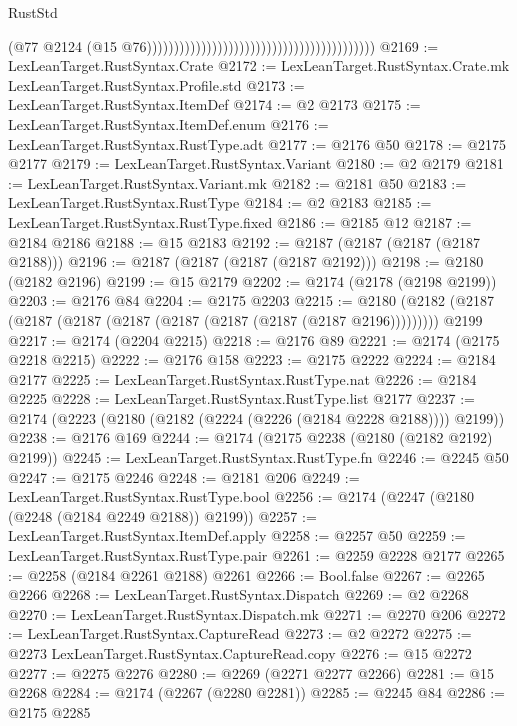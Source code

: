 \begin{lexlean}{RustStd}
\begin{coremodule}
                                                                                    (@77
                                                                                      @2124
                                                                                      (@15
                                                                                        @76))))))))))))))))))))))))))))))))))))))))))
@2169 := LexLeanTarget.RustSyntax.Crate
@2172 := LexLeanTarget.RustSyntax.Crate.mk LexLeanTarget.RustSyntax.Profile.std
@2173 := LexLeanTarget.RustSyntax.ItemDef
@2174 := @2 @2173
@2175 := LexLeanTarget.RustSyntax.ItemDef.enum
@2176 := LexLeanTarget.RustSyntax.RustType.adt
@2177 := @2176 @50
@2178 := @2175 @2177
@2179 := LexLeanTarget.RustSyntax.Variant
@2180 := @2 @2179
@2181 := LexLeanTarget.RustSyntax.Variant.mk
@2182 := @2181 @50
@2183 := LexLeanTarget.RustSyntax.RustType
@2184 := @2 @2183
@2185 := LexLeanTarget.RustSyntax.RustType.fixed
@2186 := @2185 @12
@2187 := @2184 @2186
@2188 := @15 @2183
@2192 := @2187 (@2187 (@2187 (@2187 @2188)))
@2196 := @2187 (@2187 (@2187 (@2187 @2192)))
@2198 := @2180 (@2182 @2196)
@2199 := @15 @2179
@2202 := @2174 (@2178 (@2198 @2199))
@2203 := @2176 @84
@2204 := @2175 @2203
@2215 := @2180 (@2182 (@2187 (@2187 (@2187 (@2187 (@2187 (@2187 (@2187 (@2187 @2196))))))))) @2199
@2217 := @2174 (@2204 @2215)
@2218 := @2176 @89
@2221 := @2174 (@2175 @2218 @2215)
@2222 := @2176 @158
@2223 := @2175 @2222
@2224 := @2184 @2177
@2225 := LexLeanTarget.RustSyntax.RustType.nat
@2226 := @2184 @2225
@2228 := LexLeanTarget.RustSyntax.RustType.list @2177
@2237 := @2174 (@2223 (@2180 (@2182 (@2224 (@2226 (@2184 @2228 @2188)))) @2199))
@2238 := @2176 @169
@2244 := @2174 (@2175 @2238 (@2180 (@2182 @2192) @2199))
@2245 := LexLeanTarget.RustSyntax.RustType.fn
@2246 := @2245 @50
@2247 := @2175 @2246
@2248 := @2181 @206
@2249 := LexLeanTarget.RustSyntax.RustType.bool
@2256 := @2174 (@2247 (@2180 (@2248 (@2184 @2249 @2188)) @2199))
@2257 := LexLeanTarget.RustSyntax.ItemDef.apply
@2258 := @2257 @50
@2259 := LexLeanTarget.RustSyntax.RustType.pair
@2261 := @2259 @2228 @2177
@2265 := @2258 (@2184 @2261 @2188) @2261
@2266 := Bool.false
@2267 := @2265 @2266
@2268 := LexLeanTarget.RustSyntax.Dispatch
@2269 := @2 @2268
@2270 := LexLeanTarget.RustSyntax.Dispatch.mk
@2271 := @2270 @206
@2272 := LexLeanTarget.RustSyntax.CaptureRead
@2273 := @2 @2272
@2275 := @2273 LexLeanTarget.RustSyntax.CaptureRead.copy
@2276 := @15 @2272
@2277 := @2275 @2276
@2280 := @2269 (@2271 @2277 @2266)
@2281 := @15 @2268
@2284 := @2174 (@2267 (@2280 @2281))
@2285 := @2245 @84
@2286 := @2175 @2285

\end{coremodule}
\end{lexlean}
